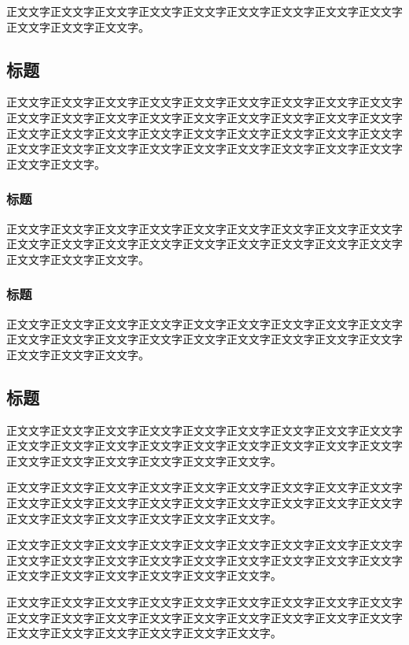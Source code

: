 正文文字正文文字正文文字正文文字正文文字正文文字正文文字正文文字正文文字正文文字正文文字正文文字。

\subsection{标题}

正文文字正文文字正文文字正文文字正文文字正文文字正文文字正文文字正文文字正文文字正文文字正文文字正文文字正文文字正文文字正文文字正文文字正文文字正文文字正文文字正文文字正文文字正文文字正文文字正文文字正文文字正文文字正文文字正文文字正文文字正文文字正文文字正文文字正文文字正文文字正文文字正文文字正文文字。

\subsubsection{标题}

正文文字正文文字正文文字正文文字正文文字正文文字正文文字正文文字正文文字正文文字正文文字正文文字正文文字正文文字正文文字正文文字正文文字正文文字正文文字正文文字正文文字。

\subsubsection{标题}

正文文字正文文字正文文字正文文字正文文字正文文字正文文字正文文字正文文字正文文字正文文字正文文字正文文字正文文字正文文字正文文字正文文字正文文字正文文字正文文字正文文字。

\subsection{标题}

正文文字正文文字正文文字正文文字正文文字正文文字正文文字正文文字正文文字正文文字正文文字正文文字正文文字正文文字正文文字正文文字正文文字正文文字正文文字正文文字正文文字正文文字正文文字正文文字。

正文文字正文文字正文文字正文文字正文文字正文文字正文文字正文文字正文文字正文文字正文文字正文文字正文文字正文文字正文文字正文文字正文文字正文文字正文文字正文文字正文文字正文文字正文文字正文文字。

正文文字正文文字正文文字正文文字正文文字正文文字正文文字正文文字正文文字正文文字正文文字正文文字正文文字正文文字正文文字正文文字正文文字正文文字正文文字正文文字正文文字正文文字正文文字正文文字。

正文文字正文文字正文文字正文文字正文文字正文文字正文文字正文文字正文文字正文文字正文文字正文文字正文文字正文文字正文文字正文文字正文文字正文文字正文文字正文文字正文文字正文文字正文文字正文文字。

